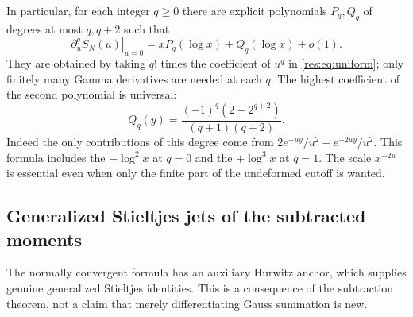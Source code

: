\documentclass[11pt,letterpaper]{article}
\numberwithin{equation}{section}
\theoremstyle{plain}
\theoremstyle{definition}
\theoremstyle{remark}
\begin{document}
In particular, for each integer $q\geq0$ there are explicit
polynomials $P_q,Q_q$ of degrees at most $q,q+2$ such that
\begin{equation}
 \left.\partial_u^q S_N(u)\right|_{u=0}
       =xP_q(\log x)+Q_q(\log x)+o(1).
 \label{res:eq:all-cutoff-jets}
\end{equation}
They are obtained by taking $q!$ times the coefficient of $u^q$
in \eqref{res:eq:uniform}; only finitely many Gamma derivatives
are needed at each $q$.  The highest coefficient of the second
polynomial is universal:
\begin{equation}
 [y^{q+2}]Q_q(y)
   =\frac{(-1)^q(2-2^{q+2})}{(q+1)(q+2)}.
 \label{res:eq:universal-log}
\end{equation}
Indeed the only contributions of this degree come from
$2e^{-uy}/u^2-e^{-2uy}/u^2$.  This formula includes the
$-\log^2x$ at $q=0$ and the $+\log^3x$ at $q=1$.
The scale $x^{-2u}$ is essential even when only the finite
part of the undeformed cutoff is wanted.

\subsection{Generalized Stieltjes jets of the subtracted moments}
The normally convergent formula has an auxiliary Hurwitz anchor,
which supplies genuine generalized Stieltjes identities.  This is
a consequence of the subtraction theorem, not a claim that merely
differentiating Gauss summation is new.
\end{document}
